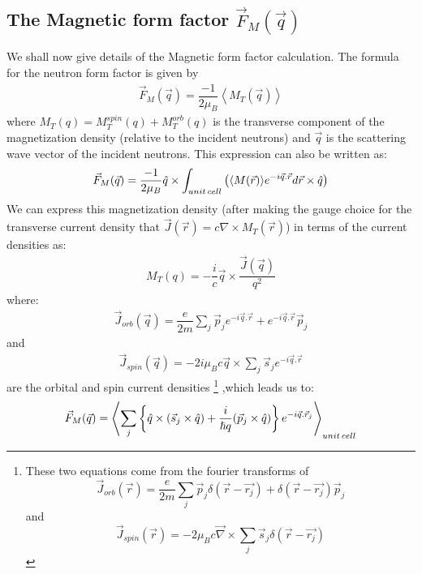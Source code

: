 \documentclass[10pt]{ruthesis}
\begin{document}
{\subsection{The Magnetic form factor $\vec{F}_{M}(\vec{q})$}
We shall now give details of the Magnetic form factor calculation. The formula for the neutron form factor is given by 
\begin{align}
\vec{F}_{M}(\vec{q})=\dfrac{-1}{2\mu_{B}} \left \langle M_{T}(\vec{q}) \right \rangle
\end{align}
where $M_{T}(q)=M_{T}^{spin}(q)+M_{T}^{orb}(q)$ is the transverse component of the magnetization density (relative to the incident neutrons)  and $\vec{q}$ is the scattering wave vector of the incident neutrons. This expression  can also be written as:
\begin{align}
\vec{F}_{M}(\vec q)=\dfrac{-1}{2\mu_{B}} \hat{q} \times \int_{unit \hspace{0.5mm} cell} \left(\langle M(\vec{r})\rangle e^{-i\vec{q}.\vec{r}} d \vec{r} \times \hat{q} \right)
\end{align}
 We can express this magnetization density (after making the gauge choice for the transverse current density that $\vec{J}(\vec{r})=c \nabla \times M_T(\vec{r})$) in terms of the current densities as:
 \begin{align}
 M_{T}(q)=-\dfrac{i}{c}\vec{q} \times \dfrac{\vec{J}(\vec{q})}{q^{2}}
 \end{align}
where:
\begin{align}
\vec{J}_{orb}(\vec{q})=\dfrac{e}{2m}\sum_{j} \vec p_{j}e^{-i \vec{q}.\vec{r}} + e^{-i\vec{q}.\vec{r}} \vec{p}_{j}
\end{align}
and 
\begin{align}
\vec{J}_{spin}(\vec{q})=-2i \mu_{B} c \vec{q} \times \sum_{j} \vec{s}_{j}e^{-i \vec{q}.\vec{r}}
\end{align}
 are the orbital and spin current densities \footnote{ These two equations come from the fourier transforms of
\begin{equation}
 \vec{J}_{orb}(\vec r)= \dfrac{e}{2m} \sum_j \vec{p}_{j} \delta (\vec{r}-\vec{r_j}) + \delta (\vec{r}-\vec{r_j}) \vec{p}_{j}
 \end{equation} 
 and 
 \begin{equation}
 \vec{J}_{spin}(\vec r)= -2\mu_B c \vec{\nabla} \times \sum_j \vec{s}_{j} \delta (\vec{r}-\vec{r_j}) 
 \end{equation} 
  }
 ,which leads us to:
\begin{align} \label{Fm1}
\vec{F}_{M}(\vec q)= \left \langle \sum_{j} \left \lbrace \hat{q} \times (\vec{s}_{j} \times \hat{q}) + \dfrac{i}{\hslash q}(\vec{p}_{j} \times \hat{q}) \right \rbrace e^{-i \vec{q} .\vec{r}_{j}} \right \rangle _{ unit \hspace{0.5mm} cell}
\end{align} 

}
\end{document}
